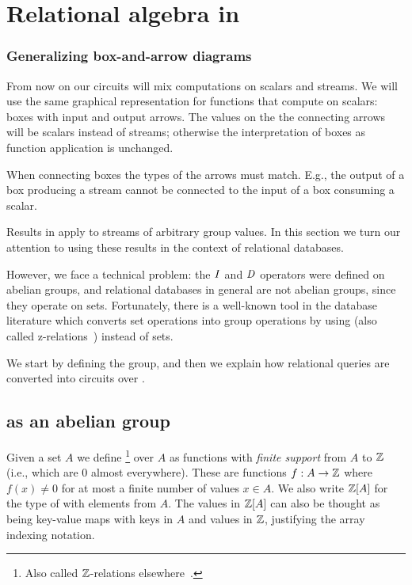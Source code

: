 \section{Relational algebra in \dbsp}\label{sec:relational}

\subsubsection{Generalizing box-and-arrow diagrams}

From now on our circuits will mix computations on scalars and streams.
We will use the same graphical representation for functions that compute
on scalars: boxes with input and output arrows.  The values on the
the connecting arrows will be scalars instead of streams; otherwise
the interpretation of boxes as function application is unchanged.

When connecting boxes the types of the arrows must match.  E.g.,
the output of a box producing a stream cannot be connected to the
input of a box consuming a scalar.

Results in  apply to streams of arbitrary group
values.  In this section we turn our attention to using these results
in the context of relational databases.

However, we face a technical problem: the $\mathit{I}$ and $\mathit{D}$ operators were
defined on abelian groups, and relational databases in general are
not abelian groups, since they operate on sets.  Fortunately,
there is a well-known tool in the database literature
which converts set operations into group operations by using \zrs
(also called z-relations~\cite{green-pods07}) instead of sets.

We start by defining the \zrs group, and then we explain how
relational queries are converted into \dbsp circuits over \zrs.

\subsection{\zrs as an abelian group}

Given a set $A$ we define \footnote{Also called $\mathbb{Z}$-relations elsewhere~\cite{green-tcs11}.}
over $A$ as functions with \emph{finite support} from $A$ to $\mathbb{Z}$ (i.e., which are 0 almost everywhere).
These are functions $f: A \rightarrow \mathbb{Z}$ where
$f(x) \not= 0$ for at most a finite number of values $x \in A$.
We also write $\mathbb{Z}[A]$ for the type of \zrs with elements from $A$.
The values in $\mathbb{Z}[A]$ can also be thought as being key-value maps with
keys in $A$ and values in $\mathbb{Z}$, justifying the array indexing notation.

